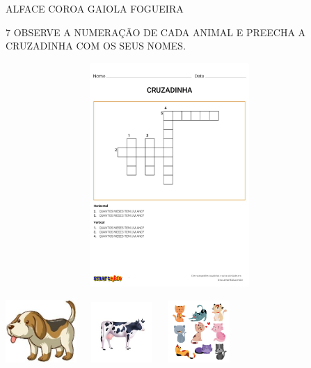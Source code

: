 ALFACE COROA GAIOLA FOGUEIRA




\num{7} OBSERVE A NUMERAÇÃO DE CADA ANIMAL E PREECHA A CRUZADINHA COM OS SEUS NOMES.


\includegraphics[width=4.90625in,height=3.34375in]{media/image90.jpg}

\includegraphics[width=1.06250in,height=0.94306in]{media/image91.jpg}
\includegraphics[width=1.24583in,height=0.90625in]{media/image92.jpg}
\includegraphics[width=0.97639in,height=0.92708in]{media/image93.jpg}

